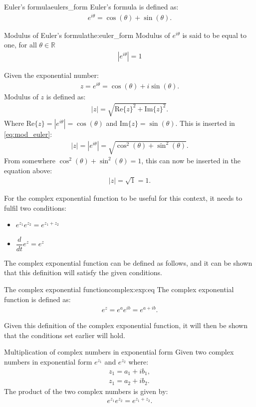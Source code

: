 \begin{definition}{Euler's formula}{eulers_form}
Euler's formula is defined as:
\begin{align}
e^{i\theta}=\cos(\theta)+\sin(\theta).
\end{align} 
\end{definition}
\begin{theorem}{Modulus of Euler's formula}{the:euler_form}
Modulus of $e^{i\theta}$ is said to be equal to one, for all $\theta \in \mathbb{R}$
\begin{align*}
|e^{i\theta}|=1
\end{align*}
\end{theorem}
\begin{prof}{}{}
Given the exponential number:
\begin{align*}
z=e^{i\theta}=\cos(\theta)+i\sin(\theta).
\end{align*}
Modulus of $z$ is defined as:
\begin{align}
|z|=\sqrt{\text{Re}\{z\}^2+\text{Im}\{z\}^2}. \label{eq:mod_euler}
\end{align}
Where $\text{Re}\{z\}=|e^{i\theta}|=\cos(\theta)$ and $\text{Im}\{z\}=\sin(\theta)$. This is inserted in \eqref{eq:mod_euler}:
\begin{align*}
|z|=|e^{i\theta}|=\sqrt{\cos^2(\theta)+\sin^2(\theta)}.
\end{align*}
From somewhere $\cos^2(\theta)+\sin^2(\theta)=1$, this can now be inserted in the equation above:
\begin{align*}
|z|=\sqrt{1}=1.
\end{align*}
\end{prof}
\noindent For the complex exponential function to be useful for this context, it needs to fulfil two conditions:
\begin{itemize}
	\item $e^{z_1}e^{z_2} = e^{z_1 + z_2}$
	\item $\dfrac{d}{dt}e^{z} = e^{z}$
\end{itemize}
The complex exponential function can be defined as follows, and it can be shown that this definition will satisfy the given conditions.

\begin{definition}{The complex exponential function}{complex:exp:eq}
The complex exponential function is defined as:
\begin{align*}
	e^{z}=e^{a}e^{ib}=e^{a+ib}.
\end{align*}
\end{definition}
\noindent
Given this definition of the complex exponential function, it will then be shown that the conditions set earlier will hold.
\begin{theorem}{Multiplication of complex numbers in exponential form}{}
Given two complex numbers in exponential form $e^{z_1}$ and $e^{z_2}$ where:
\begin{align*}
z_1=a_1+ib_1,
\\
z_1=a_2+ib_2.
\end{align*}
The product of the two complex numbers is given by:
\begin{align*}
e^{z_1}e^{z_2}=e^{z_1+z_2}.
\end{align*}
\end{theorem}


